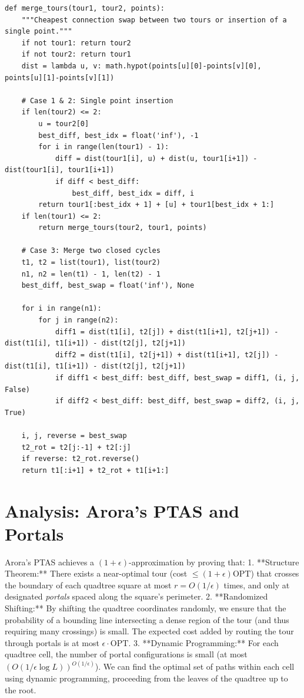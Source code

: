 \documentclass[11pt,oneside]{book}
\begin{document}
\begin{lstlisting}[style=python, caption=Cheapest swap to merge tours]
def merge_tours(tour1, tour2, points):
    """Cheapest connection swap between two tours or insertion of a single point."""
    if not tour1: return tour2
    if not tour2: return tour1
    dist = lambda u, v: math.hypot(points[u][0]-points[v][0], points[u][1]-points[v][1])
    
    # Case 1 & 2: Single point insertion
    if len(tour2) <= 2:
        u = tour2[0]
        best_diff, best_idx = float('inf'), -1
        for i in range(len(tour1) - 1):
            diff = dist(tour1[i], u) + dist(u, tour1[i+1]) - dist(tour1[i], tour1[i+1])
            if diff < best_diff:
                best_diff, best_idx = diff, i
        return tour1[:best_idx + 1] + [u] + tour1[best_idx + 1:]
    if len(tour1) <= 2:
        return merge_tours(tour2, tour1, points)
        
    # Case 3: Merge two closed cycles
    t1, t2 = list(tour1), list(tour2)
    n1, n2 = len(t1) - 1, len(t2) - 1
    best_diff, best_swap = float('inf'), None
    
    for i in range(n1):
        for j in range(n2):
            diff1 = dist(t1[i], t2[j]) + dist(t1[i+1], t2[j+1]) - dist(t1[i], t1[i+1]) - dist(t2[j], t2[j+1])
            diff2 = dist(t1[i], t2[j+1]) + dist(t1[i+1], t2[j]) - dist(t1[i], t1[i+1]) - dist(t2[j], t2[j+1])
            if diff1 < best_diff: best_diff, best_swap = diff1, (i, j, False)
            if diff2 < best_diff: best_diff, best_swap = diff2, (i, j, True)
            
    i, j, reverse = best_swap
    t2_rot = t2[j:-1] + t2[:j]
    if reverse: t2_rot.reverse()
    return t1[:i+1] + t2_rot + t1[i+1:]
\end{lstlisting}

\section{Analysis: Arora's PTAS and Portals}
Arora's PTAS achieves a $(1+\epsilon)$-approximation by proving that:
1.  **Structure Theorem:** There exists a near-optimal tour (cost $\le (1+\epsilon)\text{OPT}$) that crosses the boundary of each quadtree square at most $r = O(1/\epsilon)$ times, and only at designated \emph{portals} spaced along the square's perimeter.
2.  **Randomized Shifting:** By shifting the quadtree coordinates randomly, we ensure that the probability of a bounding line intersecting a dense region of the tour (and thus requiring many crossings) is small. The expected cost added by routing the tour through portals is at most $\epsilon \cdot \text{OPT}$.
3.  **Dynamic Programming:** For each quadtree cell, the number of portal configurations is small (at most $(O(1/\epsilon \log L))^{O(1/\epsilon)}$). We can find the optimal set of paths within each cell using dynamic programming, proceeding from the leaves of the quadtree up to the root.
\end{document}
